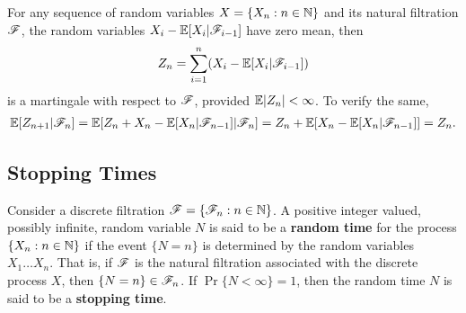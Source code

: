 \documentclass[a4paper,10pt,english]{article}
\begin{document}
\begin{shaded*}
\begin{exmp*}
For any sequence of random variables $X = \{X_n: n \in \mathbb{N}\}$ and its natural filtration $\mathscr{F}$, 
the random variables $X_i-\mathbb{E}[X_i|\mathscr{F}_{i-1}]$ have zero mean, then 
\begin{align*}
Z_n =\sum_{i=1}^n (X_i -\mathbb{E}[X_i|\mathscr{F}_{i-1}])
\end{align*}
is a martingale with respect to $\mathscr{F}$, provided $\mathbb{E} |Z_n|< \infty$.  
To verify the same, 
\begin{align*}
\mathbb{E}[Z_{n+1}|\mathscr{F}_n]&= \mathbb{E}[Z_n+X_n-\mathbb{E}[X_n|\mathscr{F}_{n-1}]|\mathscr{F}_n] = Z_n+\mathbb{E}[X_n-\mathbb{E}[X_n|\mathscr{F}_{n-1}]]=Z_n.\\
\end{align*}
\end{exmp*}
\end{shaded*}
\subsection{Stopping Times}
Consider a discrete filtration $\mathscr{F} = \{\mathscr{F}_n: n \in \mathbb{N}\}$.  
A positive integer valued, possibly infinite, random variable $N$ is said to be a \textbf{random time} for the process $\{X_n: n \in \mathbb{N}\}$ if the event $\{N=n\}$ is determined by the random variables $X_1 \hdots X_n$. 
That is, if $\mathscr{F}$ is the natural filtration associated with the discrete process $X$, then $\{N = n \} \in \mathscr{F}_n$. 
If $\Pr\{N < \infty\}=1$, then the random time $N$ is said to be a \textbf{stopping time}. 
\end{document}
